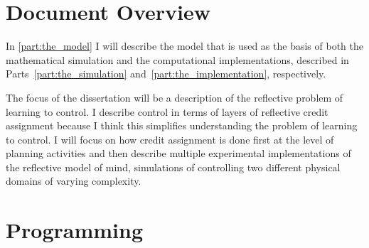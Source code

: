 \section{Document Overview}

In {\mbox{\autoref{part:the_model}}} I will describe the model that is
used as the basis of both the mathematical simulation and the
computational implementations, described in
{\mbox{Parts~\ref{part:the_simulation}}}
{\mbox{and~\ref{part:the_implementation}}}, respectively.

The focus of the dissertation will be a description of the reflective
problem of learning to control.  I describe control in terms of layers
of reflective credit assignment because I think this simplifies
understanding the problem of learning to control.  I will focus on how
credit assignment is done first at the level of planning activities
and then describe multiple experimental implementations of the
reflective model of mind, simulations of controlling two different
physical domains of varying complexity.

\section{Programming}

